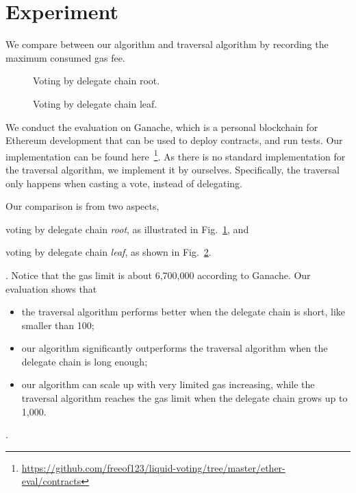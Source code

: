 \section{Experiment}
We compare between our algorithm and traversal algorithm by
recording the maximum consumed gas fee.

\begin{figure}
  
  \caption{Voting by delegate chain root.}
  \label{fig:eval:root}
\end{figure}

\begin{figure}
  
  \caption{Voting by delegate chain leaf.}
  \label{fig:eval:tail}
\end{figure}

We conduct the evaluation on Ganache, which is a
personal blockchain for Ethereum development that can be used to deploy contracts, and run tests.
Our implementation can be found here~\footnote{\url{https://github.com/freeof123/liquid-voting/tree/master/ether-eval/contracts}}.
As there is no standard implementation for the traversal algorithm, we
implement it by ourselves.  Specifically, the traversal only happens
when casting a vote, instead of delegating.

Our comparison is from two aspects, \begin{enumerate*}[1) ]%
  \item voting by delegate chain \emph{root}, as illustrated in
  Fig.~\ref{fig:eval:root}, and \item voting by delegate chain
\emph{leaf}, as shown in Fig.~\ref{fig:eval:tail}. \end{enumerate*}.
Notice that the gas limit is about 6,700,000 according to Ganache. Our
evaluation shows that \begin{itemize}
    \item the traversal algorithm performs better when the delegate chain
      is short, like smaller than 100;
    \item our algorithm significantly outperforms the traversal algorithm when
      the delegate chain is long enough;
    \item our algorithm can scale up with very limited gas increasing, while
      the traversal algorithm reaches the gas limit when the delegate chain
      grows up to 1,000.
\end{itemize}.



